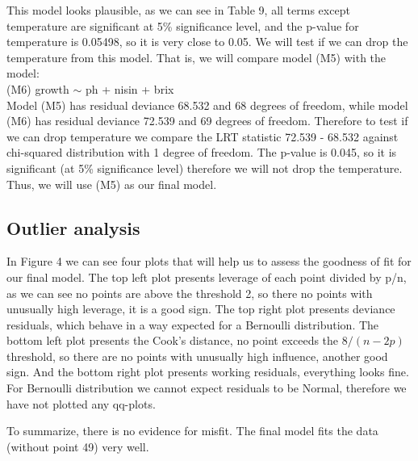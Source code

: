 \documentclass{article}
\begin{document}
This model looks plausible, as we can see in Table 9, all terms except temperature are significant at 5\% significance level, and the p-value for temperature is 0.05498, so it is very close to 0.05. We will test if we can drop the temperature from this model. That is, we will compare model (M5) with the model:
\\(M6) growth $\sim$ ph + nisin + brix \\ Model (M5) has residual deviance 68.532  and 68  degrees of freedom, while model (M6) has residual deviance 72.539  and 69  degrees of freedom. Therefore to test if we can drop temperature we compare the LRT statistic 72.539 - 68.532 against chi-squared distribution with 1 degree of freedom. The p-value is 0.045, so it is significant (at 5\% significance level) therefore we will not drop the temperature. Thus, we will use (M5) as our final model. 

\subsection{Outlier analysis}

In Figure 4 we can see four plots that will help us to assess the goodness of fit for our final model. The top left plot presents leverage of each point divided by p/n, as we can see no points are above the threshold 2, so there no points with unusually high leverage, it is a good sign. The top right plot presents deviance residuals, which behave in a way expected for a Bernoulli distribution. The bottom left plot presents the Cook's distance, no point exceeds the $8/(n-2p)$ threshold, so there are no points with unusually high influence, another good sign. And the bottom right plot presents working residuals, everything looks fine. For Bernoulli distribution we cannot expect residuals to be Normal, therefore we have not plotted any qq-plots. 

To summarize, there is no evidence for misfit. The final model fits the data (without point 49) very well. 
\end{document}
